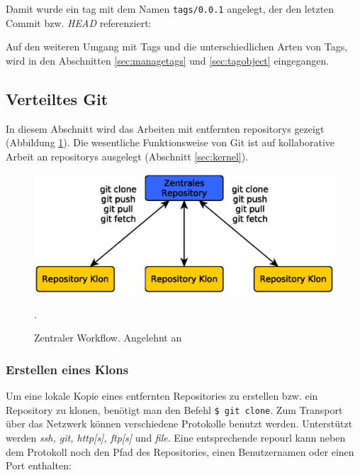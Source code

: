 
Damit wurde ein \gls{tag} mit dem Namen \texttt{tags/0.0.1} angelegt,
der den letzten Commit bzw. \textit{\gls{HEAD}} referenziert:


Auf den weiteren Umgang mit Tags und die unterschiedlichen Arten von Tags, wird
in den Abschnitten \ref{sec:managetags} und \ref{sec:tagobject} eingegangen.

\subsection{Verteiltes Git}\label{sec:distributed}
In diesem Abschnitt wird das Arbeiten mit entfernten \glspl{repository}
gezeigt (Abbildung \ref{fig:centralworkflow}). Die wesentliche Funktionsweise
von Git ist auf kollaborative Arbeit an \glspl{repository} ausgelegt (Abschnitt
\ref{sec:kernel}).

\begin{figure}[h]
  \centering
  \includegraphics[scale=0.70]{images/workflow.eps}
  \caption{Zentraler Workflow. Angelehnt an \cite[S.~138]{gitosp}}.
  \label{fig:centralworkflow}
\end{figure}

\subsubsection{Erstellen eines Klons}\label{sec:gitclone}
Um eine lokale Kopie eines entfernten Repositories zu erstellen bzw. ein
Repository zu klonen, benötigt man den Befehl \texttt{\$ git clone}. Zum
Transport über das Netzwerk können verschiedene Protokolle benutzt werden.
Unterstützt werden \textit{ssh, git, http[s], ftp[s]} und \textit{file}. Eine
entsprechende \gls{repourl} kann neben dem Protokoll noch den Pfad des
Repositories, einen Benutzernamen oder einen Port enthalten:

